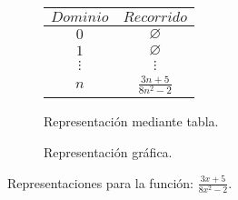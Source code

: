 \begin{figure}[h]
\centering
\begin{subfigure}[A]{0.3\textwidth}
\centering
\begin{tabular}{c|c}
$Dominio$ & $Recorrido$ \\ \hline
\hline
$0$ & $\varnothing$ \\ \hline
$1$ & $\varnothing$ \\ \hline
$\vdots$ & $\vdots$ \\ \hline
$n$& $\frac{3 n + 5}{8n^2 - 2}$ \\ \hline
\end{tabular} 
\caption{Representación mediante tabla.}

\end{subfigure}%
\quad
\begin{subfigure}[B]{0.3\textwidth}
\centering



\caption{Representación gráfica.}

\end{subfigure}

\caption{Representaciones para la función: $\frac{3 x + 5}{8 x^2 - 2}$.}

\end{figure}

